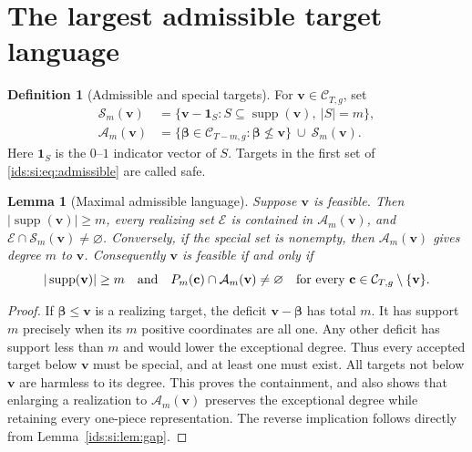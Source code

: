 \documentclass[11pt,letterpaper]{article}
\newtheorem{lemma}[theorem]{Lemma}
\theoremstyle{definition}\newtheorem{definition}[theorem]{Definition}
\theoremstyle{remark}\newtheorem{remark}[theorem]{Remark}
\theoremstyle{definition}\newtheorem{question}[theorem]{Question}
\DeclareMathOperator{\supp}{supp}
\newcommand{\bpC}[2]{\mathcal C_{#1,#2}}
\newcommand{\bpE}{\mathcal E}
\newcommand{\Adm}[1]{\mathcal A_m(#1)}
\newcommand{\bpSpecial}[1]{\mathcal S_m(#1)}
\begin{document}
\section{The largest admissible target language}\label{ids:si:sec:maximal}

\begin{definition}[Admissible and special targets]
For $\mathbf v\in\bpC{T}{g}$, set
\begin{align}
 \bpSpecial{\mathbf v}&=\{\mathbf v-\mathbf 1_S:S\subseteq\supp(\mathbf v),\ |S|=m\},\label{ids:si:eq:special}\\
 \Adm{\mathbf v}&=\{\boldsymbol\beta\in\bpC{T-m}{g}:\boldsymbol\beta\not\leq\mathbf v\}
               \ \cup\ \bpSpecial{\mathbf v}.\label{ids:si:eq:admissible}
\end{align}
Here $\mathbf 1_S$ is the $0$--$1$ indicator vector of $S$.
Targets in the first set of \eqref{ids:si:eq:admissible} are called safe.
\end{definition}

\begin{lemma}[Maximal admissible language]\label{ids:si:lem:maximal}
Suppose $\mathbf v$ is feasible. Then $|\supp(\mathbf v)|\geq m$, every realizing set
$\bpE$ is contained in $\Adm{\mathbf v}$, and $\bpE\cap\bpSpecial{\mathbf v}\ne\varnothing$.
Conversely, if the special set is nonempty, then $\Adm{\mathbf v}$ gives degree
$m$ to $\mathbf v$. Consequently $\mathbf v$ is feasible if and only if
\begin{equation}\label{ids:si:eq:canonicalcoverage}
 |\supp(\mathbf v)|\geq m\quad\hbox{and}\quad
 P_m(\mathbf c)\cap\Adm{\mathbf v}\ne\varnothing
       \quad\text{for every }\mathbf c\in\bpC{T}{g}\setminus\{\mathbf v\}.
\end{equation}
\end{lemma}
\begin{proof}
If $\boldsymbol\beta\leq\mathbf v$ is a realizing target, the deficit $\mathbf v-\boldsymbol\beta$ has total
$m$. It has support $m$ precisely when its $m$ positive coordinates are all
one. Any other deficit has support less than $m$ and would lower the
exceptional degree. Thus every accepted target below $\mathbf v$ must be special,
and at least one must exist. All targets not below $\mathbf v$ are harmless to
its degree. This proves the containment, and also shows that enlarging a
realization to $\Adm{\mathbf v}$ preserves the exceptional degree while retaining
every one-piece representation. The reverse implication follows directly
from Lemma~\ref{ids:si:lem:gap}.
\end{proof}
\end{document}
